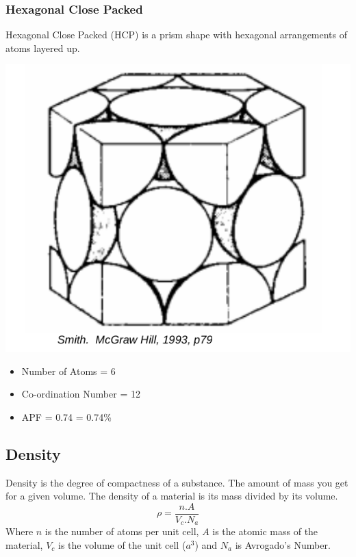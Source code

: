 \documentclass[12pt]{article}
\begin{document}
\subsubsection{Hexagonal Close Packed}
Hexagonal Close Packed (HCP) is a prism shape with hexagonal arrangements of atoms layered up.
\begin{marginfigure}
  \vspace{ -1cm }
  \includegraphics[scale=0.1]{hcp}
\end{marginfigure}

\begin{itemize}
  \item Number of Atoms = $6$
  \item Co-ordination Number = 12 
  \item APF = 0.74 = 0.74\%
\end{itemize}

\subsection{Density}
Density is the degree of compactness of a substance. 
The amount of mass you get for a given volume.
The density of a material is its mass divided by its volume.
\begin{equation*}
  \rho = \frac{n.A}{V_c.N_a}
\end{equation*}
Where $n$ is the number of atoms per unit cell, $A$ is the atomic mass of the material, $V_c$ is the volume of the unit cell ($a^3$) and $N_a$ is Avrogado's Number.
\end{document}

